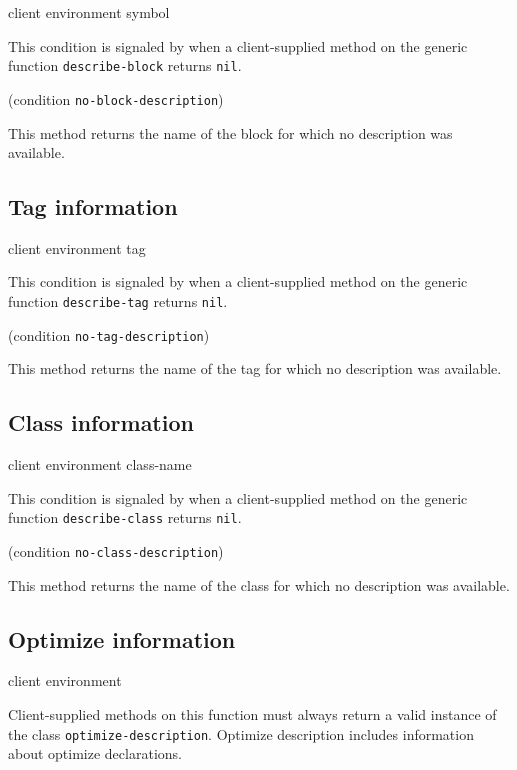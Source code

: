  {client environment symbol}


This condition is signaled by \sysname{} when a client-supplied method
on the generic function \texttt{describe-block} returns \texttt{nil}.

 {(condition {\tt no-block-description})}

This method returns the name of the block for which no description was
available.

\subsection{Tag information}

 {client environment tag}


This condition is signaled by \sysname{} when a client-supplied method
on the generic function \texttt{describe-tag} returns \texttt{nil}.

 {(condition {\tt no-tag-description})}

This method returns the name of the tag for which no description was
available.

\subsection{Class information}

 {client environment class-name}


This condition is signaled by \sysname{} when a client-supplied method
on the generic function \texttt{describe-class} returns \texttt{nil}.

 {(condition {\tt no-class-description})}

This method returns the name of the class for which no description was
available.

\subsection{Optimize information}

 {client environment}

Client-supplied methods on this function must always return a valid
instance of the class \texttt{optimize-description}. Optimize description includes
information about optimize declarations.


